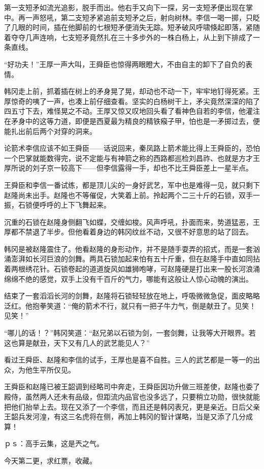 第一支短矛如流光追影，脱手而出。他右手又向下一探，另一支短矛便出现在掌中。再一声怒吼，第二支短矛紧追前支短矛之后，射向树林。李信一喝一掷，只眨了几眼的时间，插在他脚前的七根短矛便消失无踪。短矛破风呼啸倏起即落，紧随着夺夺几声连响，七支短矛竟然扎在三十多步外的一株白杨上，从上到下排成了一条直线。

“好功夫！”王厚一声大叫，王舜臣也惊得两眼瞪大，不由自主的卸下了自负的表情。

韩冈走上前，抓着插在树上的矛身晃了晃，却动也不动一下，牢牢地钉得死紧。王厚惊奇的咦了一声，也凑上前仔细查看。坚实的白杨树干上，矛尖竟然深深的陷了四五寸下去，难怪晃之不动。王厚又惊又叹地回头看了看神色自若的李信，他灌注在矛身中的这等力道，即便是西夏最为精良的精铁瘊子甲，怕也是一矛掷过去，便能扎出前后两个对穿的洞来。

论箭术李信应该不如王舜臣——话说回来，秦凤路上箭术能比得上王舜臣的，恐怕一个巴掌就能数得完，说不定能与有神箭之称的西路都巡检刘昌祚、也就是方才王厚所说的刘子京一较高下——但李信露得一手，却也不比王舜臣差上一星半点。

王舜臣和李信一番试练，都是顶儿尖的一身好武艺，军中也是难得一见，就只剩下赵隆尚未出手。赵隆也不等催促，大笑着上前。拎起两个二三十斤的石锁，双手一振，石锁便呼呼的上下飞舞起来。

沉重的石锁在赵隆身侧翻飞如蝶，交缠如梭。风声呼吼，扑面而来，势道猛恶，王厚都不禁退了半步。但他看着身边的韩冈纹丝不动，又很不好意思的站了回去。

韩冈是被赵隆震住了。他看赵隆的身形动作，并不是随手耍弄的招式，而是一套汹涌澎湃如长河巨浪的剑舞。两具石锁加起来怕有五十斤重，但在赵隆手中直如同拈着两根绣花针。石锁卷起的道道旋风如雄狮咆哮，可赵隆硬是打出来一股长河浪涌绵绵不绝的感觉，双手上没有千百斤的气力，哪能有这般让人惊心动魄的演出。

结束了一套滔滔长河的剑舞，赵隆将石锁轻轻放在地上，呼吸微微急促，面皮略略泛红。他抱拳笑道：“俺的箭术不行，就只有一把子牛力气，倒是献丑了。见笑！见笑！”

“哪儿的话！？”韩冈笑道：“赵兄弟以石锁为剑，一套剑舞，让我等大开眼界。若这也算是献丑，天下又有几人的武艺能见人？”

看过王舜臣、赵隆和李信的试手，王厚也是喜不自胜。三人的武艺都是一等一的出众，为他生平所仅见。

王舜臣和赵隆已被王韶调到经略司中奔走，王舜臣因功升做三班差使，赵隆也委了殿侍，虽然两人还未有品级，但距流内品官也没多远了，只要稍立功勋，很快就能把他们抬举上去。现在又添了一个李信，而且还是韩冈表兄，更是亲近。日后父亲王韶兵发河湟，有这三名虎将在侧，再加上韩冈的智计谋略，当是又添了几分成算！

ｐｓ：高手云集，这是兲之气。

今天第二更，求红票，收藏。

